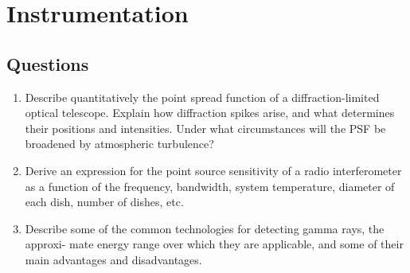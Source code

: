 \section{Instrumentation}
\subsection{Questions}
\begin{enumerate}
\item Describe quantitatively the point spread function of a diffraction-limited optical
      telescope. Explain how diffraction spikes arise, and what determines their positions
      and intensities. Under what circumstances will the PSF be broadened by atmospheric
      turbulence?
\item Derive an expression for the point source sensitivity of a radio interferometer as
      a function of the frequency, bandwidth, system temperature, diameter of each dish,
      number of dishes, etc.
\item Describe some of the common technologies for detecting gamma rays, the approxi-
      mate energy range over which they are applicable, and some of their main advantages
      and disadvantages.
\end{enumerate}
